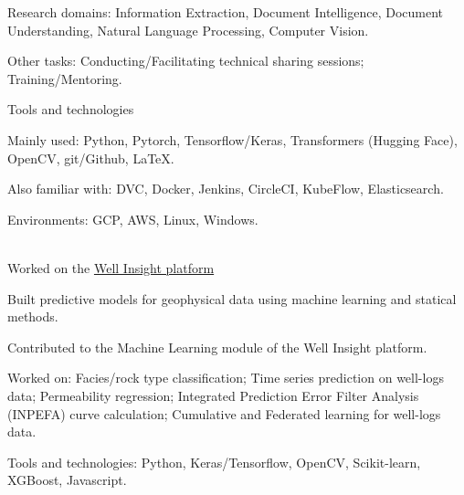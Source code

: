 \begin{xitemize}
\begin{zitemize}
    \end{zitemize}
    \item Research domains: Information Extraction, Document Intelligence, Document Understanding, Natural Language Processing, Computer Vision.
    \item Other tasks: Conducting/Facilitating technical sharing sessions; Training/Mentoring.
    \item Tools and technologies
    \begin{zitemize}
        \item Mainly used: Python, Pytorch, Tensorflow/Keras, Transformers (Hugging Face), OpenCV, git/Github, \LaTeX.
        \item Also familiar with: DVC, Docker, Jenkins, CircleCI, KubeFlow, Elasticsearch.
        \item Environments: GCP, AWS, Linux, Windows.
    \end{zitemize}
\end{xitemize}

\\
\bigskip
Worked on the \href{https://www.i2g.cloud/well-insight}{Well Insight platform \faUpRightFromSquare}
\begin{xitemize}
    \item Built predictive models for geophysical data using machine learning and statical methods.
    \item Contributed to the Machine Learning module of the Well Insight platform.
    \item Worked on: Facies/rock type classification; Time series prediction on well-logs data; Permeability regression; Integrated Prediction Error Filter Analysis (INPEFA) curve calculation; Cumulative and Federated learning for well-logs data.
    \item Tools and technologies: Python, Keras/Tensorflow, OpenCV, Scikit-learn, XGBoost, Javascript.
\end{xitemize}

